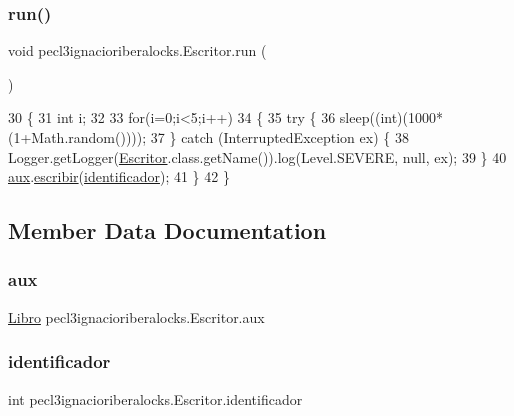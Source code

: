 \subsubsection{\texorpdfstring{run()}{run()}}
{\footnotesize\ttfamily void pecl3ignacioriberalocks.\+Escritor.\+run (\begin{DoxyParamCaption}{ }\end{DoxyParamCaption})\hspace{0.3cm}{\ttfamily [inline]}}


\begin{DoxyCode}
30     \{
31         \textcolor{keywordtype}{int} i;
32         
33         \textcolor{keywordflow}{for}(i=0;i<5;i++)
34         \{
35             \textcolor{keywordflow}{try} \{
36                 sleep((\textcolor{keywordtype}{int})(1000*(1+Math.random())));
37             \} \textcolor{keywordflow}{catch} (InterruptedException ex) \{
38                 Logger.getLogger(\mbox{\hyperlink{classpecl3ignacioriberalocks_1_1_escritor_a78d90f3839ce3e3db6431ed3e3c3d774}{Escritor}}.class.getName()).log(Level.SEVERE, null, ex);
39             \}
40             \mbox{\hyperlink{classpecl3ignacioriberalocks_1_1_escritor_a9b5a1087cd14e067a353af97ca7515c9}{aux}}.\mbox{\hyperlink{classpecl3ignacioriberalocks_1_1_libro_ab122d519b84415808a92fd4582cc47d3}{escribir}}(\mbox{\hyperlink{classpecl3ignacioriberalocks_1_1_escritor_a95d141e27b252a1c86ac193df9a56df1}{identificador}});
41         \}
42     \}
\end{DoxyCode}


\subsection{Member Data Documentation}
\mbox{\label{classpecl3ignacioriberalocks_1_1_escritor_a9b5a1087cd14e067a353af97ca7515c9}} 
\subsubsection{\texorpdfstring{aux}{aux}}
{\footnotesize\ttfamily \mbox{\hyperlink{classpecl3ignacioriberalocks_1_1_libro}{Libro}} pecl3ignacioriberalocks.\+Escritor.\+aux\hspace{0.3cm}{\ttfamily [package]}}

\mbox{\label{classpecl3ignacioriberalocks_1_1_escritor_a95d141e27b252a1c86ac193df9a56df1}} 
\subsubsection{\texorpdfstring{identificador}{identificador}}
{\footnotesize\ttfamily int pecl3ignacioriberalocks.\+Escritor.\+identificador\hspace{0.3cm}{\ttfamily [private]}}

